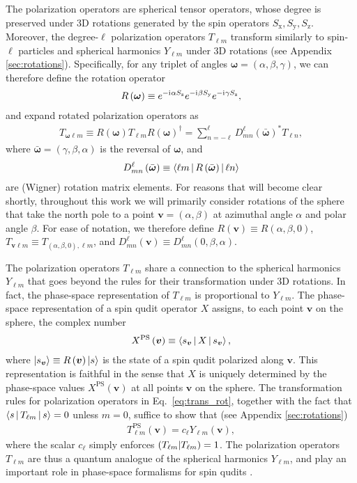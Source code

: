 \documentclass[a4paper,twocolumn,unpublished]{quantumarticle}
\renewcommand{\t}{\text} %
\newcommand{\p}[1]{\left(#1\right)} %
\newcommand{\bk}{\Braket} %
\renewcommand{\i}{\mathrm{i}\mkern1mu} %
\newcommand{\x}{\text{x}}
\newcommand{\y}{\text{y}}
\newcommand{\z}{\text{z}}
\def\obk#1{\mathinner{({#1})}}
\begin{document}
The polarization operators are spherical tensor operators, whose degree is preserved under 3D rotations generated by the spin operators $S_\x,S_\y,S_\z$.
Moreover, the degree-$\ell$ polarization operators $T_{\ell m}$ transform similarly to spin-$\ell$ particles and spherical harmonics $Y_{\ell m}$ under 3D rotations (see Appendix \ref{sec:rotations}).
Specifically, for any triplet of angles $\bm\omega=\p{\alpha,\beta,\gamma}$, we can therefore define the rotation operator
\begin{align}
  R\p{\bm\omega} \equiv e^{-\i\alpha S_\z} e^{-\i\beta S_\y} e^{-\i\gamma S_\z},
\end{align}
and expand rotated polarization operators as
\begin{align}
  T_{\bm\omega\ell m} \equiv
  R\p{\bm\omega} T_{\ell m} R\p{\bm\omega}^\dag
  = \sum_{n=-\ell}^\ell D_{mn}^\ell\p{\bar{\bm\omega}}^* T_{\ell n},
  \label{eq:trans_rot}
\end{align}
where $\bar{\bm\omega}=\p{\gamma,\beta,\alpha}$ is the reversal of $\bm\omega$, and
\begin{align}
  D_{mn}^\ell\p{\bar{\bm\omega}}
  \equiv \bk{\ell m|R\p{\bar{\bm\omega}}|\ell n}
\end{align}
are (Wigner) rotation matrix elements.
For reasons that will become clear shortly, throughout this work we will primarily consider rotations of the sphere that take the north pole to a point $\bm v=\p{\alpha,\beta}$ at azimuthal angle $\alpha$ and polar angle $\beta$.
For ease of notation, we therefore define $R\p{\bm v} \equiv R\p{\alpha,\beta,0}$, $T_{\bm v\ell m} \equiv T_{\p{\alpha,\beta,0},\ell m}$, and $D^\ell_{mn}\p{\bm v} \equiv D^\ell_{mn}\p{0,\beta,\alpha}$.

The polarization operators $T_{\ell m}$ share a connection to the spherical harmonics $Y_{\ell m}$ that goes beyond the rules for their transformation under 3D rotations.
In fact, the phase-space representation of $T_{\ell m}$ is proportional to $Y_{\ell m}$.
The phase-space representation of a spin qudit operator $X$ assigns, to each point $\bm v$ on the sphere, the complex number
\begin{align}
  X^{\t{PS}}\p{\bm v} \equiv \bk{s_{\bm v}|X|s_{\bm v}},
\end{align}
where $\ket{s_{\bm v}}\equiv R\p{\bm v}\ket{s}$ is the state of a spin qudit polarized along $\bm v$.
This representation is faithful in the sense that $X$ is uniquely determined by the phase-space values $X^{\t{PS}}\p{\bm v}$ at all points $\bm v$ on the sphere.
The transformation rules for polarization operators in Eq.~\eqref{eq:trans_rot}, together with the fact that $\bk{s|T_{\ell m}|s}=0$ unless $m=0$, suffice to show that (see Appendix \ref{sec:rotations})
\begin{align}
  T_{\ell m}^{\t{PS}}\p{\bm v} = c_\ell Y_{\ell m}\p{\bm v},
\end{align}
where the scalar $c_\ell$ simply enforces $\obk{T_{\ell m}|T_{\ell m}}=1$.
The polarization operators $T_{\ell m}$ are thus a quantum analogue of the spherical harmonics $Y_{\ell m}$, and play an important role in phase-space formalisms for spin qudits \cite{li2013weylwignermoyal}.
\end{document}
